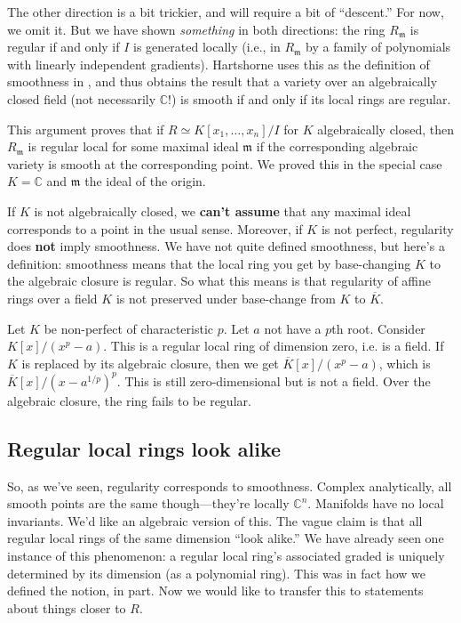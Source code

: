 The other direction is a bit trickier, and will require a bit of ``descent.''
For now, we omit it. But we have shown \emph{something} in both directions: the
ring $R_{\mathfrak{m}}$ is regular if and only if $I$ is generated 
locally (i.e., in $R_{\mathfrak{m}}$ by a family of polynomials with linearly
independent gradients). Hartshorne uses this as the definition of smoothness in
\cite{Ha77}, and thus obtains the result that a variety over an algebraically
closed field (not necessarily $\mathbb{C}$!) is smooth if and only if its local rings are regular.

\begin{remark}[Warning] This argument proves that if $R \simeq K[x_1, \dots,
x_n]/I$ for $K$ algebraically closed, then $R_{\mathfrak{m}}$ is regular local for some maximal ideal
$\mathfrak{m}$ if the corresponding algebraic variety is smooth at the
corresponding point. We proved this in the special case $K  = \mathbb{C}$ and
$\mathfrak{m}$ the ideal of the origin.

If $K$ is not algebraically closed, we \textbf{can't assume} that any maximal
ideal corresponds to a point in the usual sense. Moreover, if $K$ is not
perfect, regularity does \textbf{not} imply smoothness. We have not quite
defined smoothness, but here's a definition: smoothness means that the local
ring you get by base-changing $K$ to the algebraic closure is regular. So what
this means is that 
regularity of affine rings over a field $K$ is not preserved under
base-change from $K$ to $\overline{K}$. 
\end{remark} 

\begin{example} Let $K$ be non-perfect of characteristic $p$. Let $a$ not have
a $p$th root.
Consider $K[x]/(x^p -a)$. This is a regular local ring of dimension zero, i.e.
is a field. If $K$ is replaced by its algebraic closure, then we get
$\overline{K}[x]/(x^p - a)$, which is $\overline{K}[x]/(x- a^{1/p})^p$. This is
still zero-dimensional but is not a field. Over the algebraic closure, the ring
fails to be regular.
\end{example} 



\subsection{Regular local rings look alike}
So, as we've seen, regularity corresponds to smoothness. Complex analytically,
all smooth points are the same though---they're locally $\mathbb{C}^n$.
Manifolds have no local invariants.
We'd like
an algebraic version of this. The vague
claim is that all regular local rings of the same dimension ``look alike.''
We have already seen one instance of this phenomenon: a regular local
ring's associated graded is uniquely determined by its dimension (as a
polynomial ring). This was in fact how we defined the notion, in part.
Now we would like to transfer this to statements about things
closer to $R$. 

